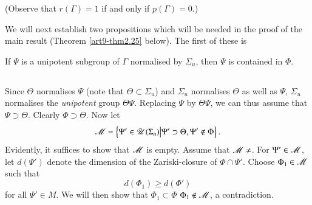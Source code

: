 (Observe that $r (\Gamma) = 1$ if and only if $p(\Gamma) = 0$.)

We will next establish two propositions which will be needed in the proof of the main result (Theorem \ref{art9-thm2.25} below). The first of these is 

\setcounter{proposition}{20}
\begin{proposition}\label{art9-prop2.21}
If $\Psi$ is a unipotent subgroup of $\Gamma$ normalised by $\Sigma_u$, then $\Psi$ is contained in $\Phi$.
\end{proposition}

\setcounter{subsection}{21}
\subsection{}\label{art9-subsec2.22}
Since $\Theta$ normalises $\Psi$ (note that $\Theta \subset \Sigma_u$) and $\Sigma_u$ normalises $\Theta$ as well as $\Psi$, $\Sigma_u$ normalises the \textit{unipotent} group $\Theta \Psi$. Replacing $\Psi$ by $\Theta \Psi$, we can thus assume that $\Psi \supset \Theta$. Clearly $\Phi \supset \Theta$. Now let 
$$
\mathscr{M} = \left\{\Psi' \in \mathscr{U} (\Sigma_u) \big| \Psi' \supset \Theta, \Psi' \not\in \Phi  \right\}.
$$
Evidently, it suffices to show that $\mathscr{M}$ is empty. Assume that $\sM \neq \empty$. For $\Psi' \in \mathscr{M}$, let $d(\Psi')$ denote the dimension of the Zariski-closure of $\Phi \cap \Psi'$. Choose $\Phi_1 \in \mathscr{M}$ such that 
$$
d (\Phi_1) \geqslant d (\Phi')
$$
for all $\Psi' \in M$. We will then show that $\Phi_1 \subset \Phi$ \ie $\Phi_1 \not\in \mathscr{M}$, a contradiction.


